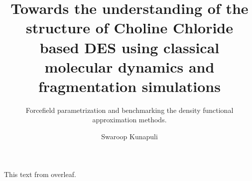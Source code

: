 \documentclass{customformat}
\begin{document}
\author{Swaroop Kunapuli}
\title{Towards the understanding of the structure of Choline Chloride based DES using classical molecular dynamics and fragmentation simulations}
\subtitle{Forcefield parametrization and benchmarking the density functional approximation methods.}

\maketitle
\newpage
\tableofcontents
\newpage


This text from overleaf.

\end{document}
